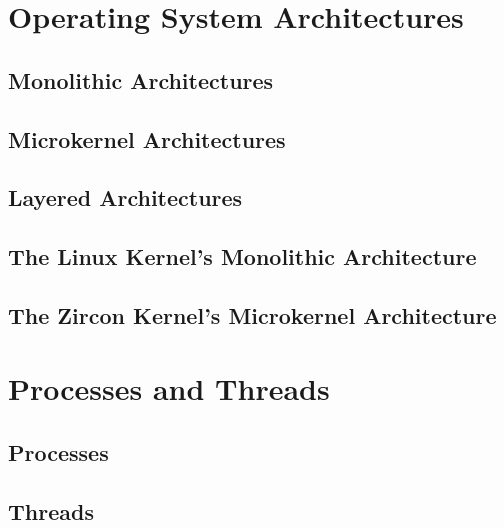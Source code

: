 %
% 
%


\section{Operating System Architectures}\label{sec:kernel-arch-concepts}
\subsection{Monolithic Architectures}
\subsection{Microkernel Architectures}
\subsection{Layered Architectures}
\subsection{The Linux Kernel's Monolithic Architecture}
\subsection{The Zircon Kernel's Microkernel Architecture}


\section{Processes and Threads} %
\subsection{Processes}
\subsection{Threads}
